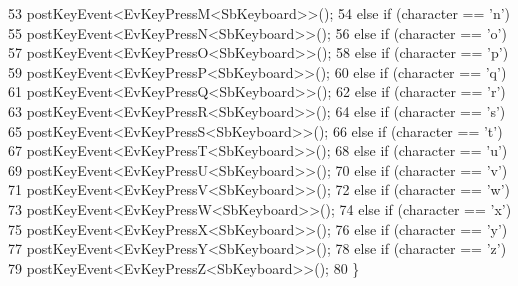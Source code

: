 \begin{DoxyCode}
53                         postKeyEvent<EvKeyPressM<SbKeyboard>>();
54                 \textcolor{keywordflow}{else} \textcolor{keywordflow}{if} (character == \textcolor{charliteral}{'n'})
55                         postKeyEvent<EvKeyPressN<SbKeyboard>>();
56                 \textcolor{keywordflow}{else} \textcolor{keywordflow}{if} (character == \textcolor{charliteral}{'o'})
57                         postKeyEvent<EvKeyPressO<SbKeyboard>>();
58                 \textcolor{keywordflow}{else} \textcolor{keywordflow}{if} (character == \textcolor{charliteral}{'p'})
59                         postKeyEvent<EvKeyPressP<SbKeyboard>>();
60                 \textcolor{keywordflow}{else} \textcolor{keywordflow}{if} (character == \textcolor{charliteral}{'q'})
61                         postKeyEvent<EvKeyPressQ<SbKeyboard>>();
62                 \textcolor{keywordflow}{else} \textcolor{keywordflow}{if} (character == \textcolor{charliteral}{'r'})
63                         postKeyEvent<EvKeyPressR<SbKeyboard>>();
64                 \textcolor{keywordflow}{else} \textcolor{keywordflow}{if} (character == \textcolor{charliteral}{'s'})
65                         postKeyEvent<EvKeyPressS<SbKeyboard>>();
66                 \textcolor{keywordflow}{else} \textcolor{keywordflow}{if} (character == \textcolor{charliteral}{'t'})
67                         postKeyEvent<EvKeyPressT<SbKeyboard>>();
68                 \textcolor{keywordflow}{else} \textcolor{keywordflow}{if} (character == \textcolor{charliteral}{'u'})
69                         postKeyEvent<EvKeyPressU<SbKeyboard>>();
70                 \textcolor{keywordflow}{else} \textcolor{keywordflow}{if} (character == \textcolor{charliteral}{'v'})
71                         postKeyEvent<EvKeyPressV<SbKeyboard>>();
72                 \textcolor{keywordflow}{else} \textcolor{keywordflow}{if} (character == \textcolor{charliteral}{'w'})
73                         postKeyEvent<EvKeyPressW<SbKeyboard>>();
74                 \textcolor{keywordflow}{else} \textcolor{keywordflow}{if} (character == \textcolor{charliteral}{'x'})
75                         postKeyEvent<EvKeyPressX<SbKeyboard>>();
76                 \textcolor{keywordflow}{else} \textcolor{keywordflow}{if} (character == \textcolor{charliteral}{'y'})
77                         postKeyEvent<EvKeyPressY<SbKeyboard>>();
78                 \textcolor{keywordflow}{else} \textcolor{keywordflow}{if} (character == \textcolor{charliteral}{'z'})
79                         postKeyEvent<EvKeyPressZ<SbKeyboard>>();
80         \}
\end{DoxyCode}


